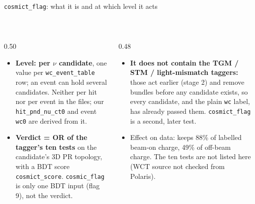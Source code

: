 \documentclass[aspectratio=169,10pt]{beamer}
\newcommand{\code}[1]{\texttt{#1}}
\begin{document}
\begin{frame}{\code{cosmict\_flag}: what it is and at which level it acts}
{}\\[8pt]
  \raggedright\scriptsize
  \begin{columns}[T]
    \begin{column}{0.50\textwidth}
      \begin{itemize}\setlength{\itemsep}{2pt}
        \item \textbf{Level: per $\nu$ candidate}, one value per \code{wc\_event\_table} row; an event can hold several candidates.
          Neither per hit nor per event in the files; our \code{hit\_pnd\_nu\_ct0} and event \code{wc0} are derived from it.
        \item \textbf{Verdict = OR of the tagger's ten tests} on the candidate's 3D PR topology, with a BDT score \code{cosmict\_score}.
          \code{cosmic\_flag} is only one BDT input (flag 9), not the verdict.
      \end{itemize}
    \end{column}
    \begin{column}{0.48\textwidth}
      \begin{itemize}\setlength{\itemsep}{2pt}
        \item \textbf{It does not contain the TGM / STM / light-mismatch taggers:} those act earlier (stage 2) and remove bundles before
          any candidate exists, so every candidate, and the plain \code{wc} label, has already passed them. \code{cosmict\_flag} is a
          second, later test.
        \item Effect on data: keeps 88\% of labelled beam-on charge, 49\% of off-beam charge. The ten tests are not listed here
          (WCT source not checked from Polaris).
      \end{itemize}
    \end{column}
  \end{columns}
\end{frame}
\end{document}
